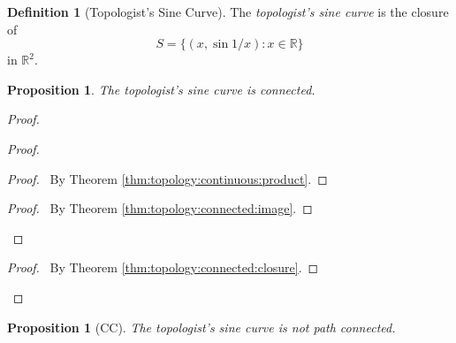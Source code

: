 \documentclass{report}
\let\qed\relax
\newtheorem{prop}[lm]{Proposition}
\theoremstyle{definition}
\newtheorem{df}[lm]{Definition}
\begin{document}
  \begin{df}[Topologist's Sine Curve]
    The \emph{topologist's sine curve} is the closure of
    \[ S = \{ (x, \sin 1/x) : x \in \mathbb{R} \} \]
    in $\mathbb{R}^2$.
  \end{df}

  \begin{prop}
    The topologist's sine curve is connected.
  \end{prop}

  \begin{proof}
    \pf
    \begin{proof}
      \begin{proof}
        \pf\ By Theorem \ref{thm:topology:continuous:product}.
      \end{proof}
      \qedstep
      \begin{proof}
        \pf\ By Theorem \ref{thm:topology:connected:image}.
      \end{proof}
    \end{proof}
    \qedstep
    \begin{proof}
      \pf\ By Theorem \ref{thm:topology:connected:closure}.
    \end{proof}
    \qed
  \end{proof}

  \begin{prop}[CC]
    The topologist's sine curve is not path connected.
  \end{prop}
\end{document}
